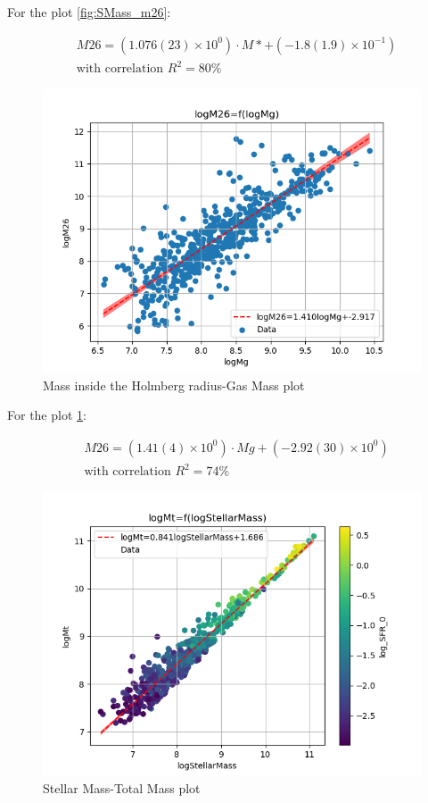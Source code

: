 \documentclass[a4paper,twocolumn]{article}
\begin{document}
For the plot \ref{fig:SMass_m26}:

\begin{equation}\label{eq:logStellarMass-logM26}
\begin{align}
& M26 = (1.076(23) \times 10^{0})\cdot M* + (-1.8(1.9) \times 10^{-1}) \\ 
& \textrm{with correlation } R^2=80\%
\end{align}
\end{equation}
\noindent

\begin{figure}[!htpb]
\centering
\includegraphics[width=.9\linewidth]{./figs/logMg-logM26.png}
\caption{\label{fig:mg_m26}Mass inside the Holmberg radius-Gas Mass plot}
\end{figure}

For the plot \ref{fig:mg_m26}:

\begin{equation}\label{eq:logMg-logM26}
\begin{align}
& M26 = (1.41(4) \times 10^{0})\cdot Mg + (-2.92(30) \times 10^{0}) \\ 
& \textrm{with correlation } R^2=74\%
\end{align}
\end{equation}
\noindent

\begin{figure}[!htpb]
\centering
\includegraphics[width=.9\linewidth]{./figs/logStellarMass-logMt-color_log_SFR_0.png}
\caption{\label{fig:SMass_mt}Stellar Mass-Total Mass plot}
\end{figure}
\end{document}
